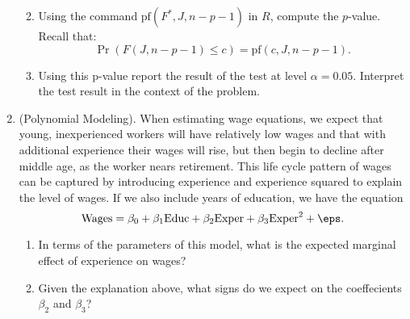 \documentclass[10pt]{article}
\begin{document}
\begin{enumerate}
\begin{enumerate}
		 
		\item Using the command \(\text{pf}(F^*, J, n-p-1)\) in  \(R\), compute the  \(p\)-value. Recall that:
		 \[
			 \Pr\left(F(J,n-p-1) \leq c\right) = \text{pf}(c, J, n-p-1)
		.\]

		 
		\item Using this p-value report the result of the test at level \(\alpha = 0.05\). Interpret the test result in the context of the problem.

		 
	\end{enumerate}
	\item (Polynomial Modeling). When estimating wage equations, we expect that young, inexperienced workers will have relatively low wages and that with additional experience their wages will rise, but then begin to decline after middle age, as the worker nears retirement. This life cycle pattern of wages can be captured by introducing experience and experience squared to explain the level of wages. If we also include years of education, we have the equation
	\[
		\text{Wages} = \beta_0 + \beta_1\text{Educ} + \beta_2\text{Exper} + \beta_3\text{Exper}^2 + \eps
	.\] 
	\begin{enumerate}
		\item In terms of the parameters of this model, what is the expected marginal effect of experience on wages?

		 
		\item Given the explanation above, what signs do we expect on the coeffecients \(\beta_2\) and  \(\beta_3\)?


\end{enumerate}
\end{enumerate}
\end{document}

